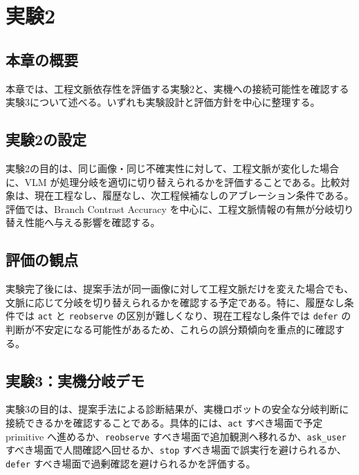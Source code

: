 \chapter{実験2}

\section{本章の概要}

本章では、工程文脈依存性を評価する実験2と、実機への接続可能性を確認する実験3について述べる。いずれも実験設計と評価方針を中心に整理する。

\section{実験2の設定}

実験2の目的は、同じ画像・同じ不確実性に対して、工程文脈が変化した場合に、VLM が処理分岐を適切に切り替えられるかを評価することである。比較対象は、現在工程なし、履歴なし、次工程候補なしのアブレーション条件である。評価では、Branch Contrast Accuracy を中心に、工程文脈情報の有無が分岐切り替え性能へ与える影響を確認する。

\section{評価の観点}

実験完了後には、提案手法が同一画像に対して工程文脈だけを変えた場合でも、文脈に応じて分岐を切り替えられるかを確認する予定である。特に、履歴なし条件では \texttt{act} と \texttt{reobserve} の区別が難しくなり、現在工程なし条件では \texttt{defer} の判断が不安定になる可能性があるため、これらの誤分類傾向を重点的に確認する。

\section{実験3：実機分岐デモ}

実験3の目的は、提案手法による診断結果が、実機ロボットの安全な分岐判断に接続できるかを確認することである。具体的には、\texttt{act} すべき場面で予定 primitive へ進めるか、\texttt{reobserve} すべき場面で追加観測へ移れるか、\texttt{ask\_user} すべき場面で人間確認へ回せるか、\texttt{stop} すべき場面で誤実行を避けられるか、\texttt{defer} すべき場面で過剰確認を避けられるかを評価する。

